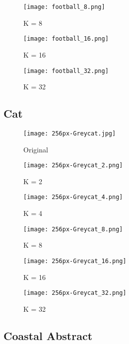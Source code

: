 \documentclass{article}
\begin{document}
\begin{figure}[H]
    \centering
    \texttt{[image: football\_8.png]}
    \caption{K = 8}
\end{figure}

\begin{figure}[H]
    \centering
    \texttt{[image: football\_16.png]}
    \caption{K = 16}
\end{figure}

\begin{figure}[H]
    \centering
    \texttt{[image: football\_32.png]}
    \caption{K = 32}
\end{figure}



\subsection*{Cat}
\begin{figure}[H]
    \centering
    \texttt{[image: 256px-Greycat.jpg]}
    \caption{Original}
\end{figure}

\begin{figure}[H]
    \centering
    \texttt{[image: 256px-Greycat\_2.png]}
    \caption{K = 2}
\end{figure}

\begin{figure}[H]
    \centering
    \texttt{[image: 256px-Greycat\_4.png]}
    \caption{K = 4}
\end{figure}

\begin{figure}[H]
    \centering
    \texttt{[image: 256px-Greycat\_8.png]}
    \caption{K = 8}
\end{figure}

\begin{figure}[H]
    \centering
    \texttt{[image: 256px-Greycat\_16.png]}
    \caption{K = 16}
\end{figure}

\begin{figure}[H]
    \centering
    \texttt{[image: 256px-Greycat\_32.png]}
    \caption{K = 32}
\end{figure}


\subsection*{Coastal Abstract}
\end{document}
